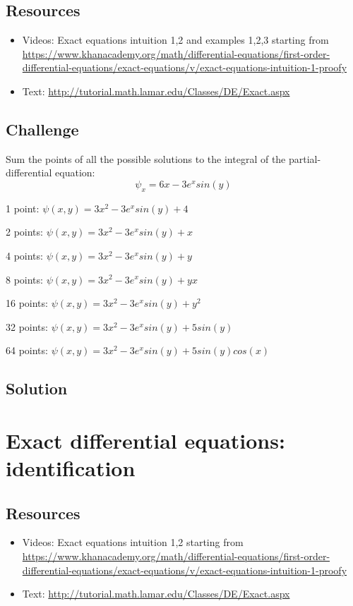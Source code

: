\subsection*{Resources}
\begin{itemize}
    \item Videos: Exact equations intuition 1,2 and examples 1,2,3 starting from \url{https://www.khanacademy.org/math/differential-equations/first-order-differential-equations/exact-equations/v/exact-equations-intuition-1-proofy}
    \item Text: \url{http://tutorial.math.lamar.edu/Classes/DE/Exact.aspx}
\end{itemize}

\subsection*{Challenge}
Sum the points of all the possible solutions to the integral of the partial-differential equation:
\begin{equation}
    \psi_x = 6x - 3e^x sin(y)
\end{equation}

1 point: $\psi(x,y) = 3x^2-3e^x sin(y) + 4$

2 points: $\psi(x,y) = 3x^2-3e^x sin(y) + x$

4 points: $\psi(x,y) = 3x^2-3e^x sin(y) + y$

8 points: $\psi(x,y) = 3x^2-3e^x sin(y) + yx$

16 points: $\psi(x,y) = 3x^2-3e^x sin(y) + y^2$

32 points: $\psi(x,y) = 3x^2-3e^x sin(y) + 5 sin(y)$

64 points: $\psi(x,y) = 3x^2-3e^x sin(y) + 5 sin(y)cos(x)$

\subsection*{Solution}
\six{}


\timebox



\newpage
\section{Exact differential equations: identification}
\label{sec:edeid}

\subsection*{Resources}
\begin{itemize}
    \item Videos: Exact equations intuition 1,2 starting from \url{https://www.khanacademy.org/math/differential-equations/first-order-differential-equations/exact-equations/v/exact-equations-intuition-1-proofy}
    \item Text: \url{http://tutorial.math.lamar.edu/Classes/DE/Exact.aspx}
\end{itemize}

